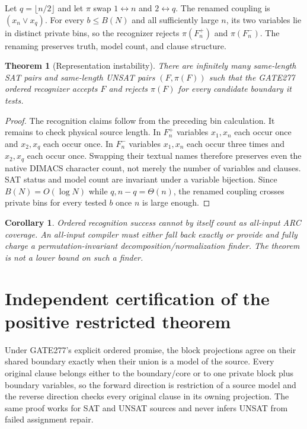 \documentclass[11pt]{article}
\newtheorem{theorem}{Theorem}
\newtheorem{corollary}{Corollary}
\begin{document}
Let $q=\lfloor n/2\rfloor$ and let $\pi$ swap $1\leftrightarrow n$ and
$2\leftrightarrow q$.  The renamed coupling is $(x_n\vee x_q)$.  For every
$b\le B(N)$ and all sufficiently large $n$, its two variables lie in distinct
private bins, so the recognizer rejects $\pi(F_n^+)$ and $\pi(F_n^-)$.  The
renaming preserves truth, model count, and clause structure.

\begin{theorem}[Representation instability]
There are infinitely many same-length SAT pairs and same-length UNSAT pairs
$(F,\pi(F))$ such that the GATE277 ordered recognizer accepts $F$ and rejects
$\pi(F)$ for every candidate boundary it tests.
\end{theorem}
\begin{proof}
The recognition claims follow from the preceding bin calculation.  It remains
to check physical source length.  In $F_n^+$ variables $x_1,x_n$ each occur
once and $x_2,x_q$ each occur once.  In $F_n^-$ variables $x_1,x_n$ each
occur three times and $x_2,x_q$ each occur once.  Swapping their textual names
therefore preserves even the native DIMACS character count, not merely the
number of variables and clauses.  SAT status and model count are invariant
under a variable bijection.  Since $B(N)=O(\log N)$ while $q,n-q=\Theta(n)$,
the renamed coupling crosses private bins for every tested $b$ once $n$ is
large enough.
\end{proof}

\begin{corollary}
Ordered recognition success cannot by itself count as all-input ARC coverage.
An all-input compiler must either fall back exactly or provide and fully charge
a permutation-invariant decomposition/normalization finder.  The theorem is
not a lower bound on such a finder.
\end{corollary}

\section{Independent certification of the positive restricted theorem}
Under GATE277's explicit ordered promise, the block projections agree on their
shared boundary exactly when their union is a model of the source.  Every
original clause belongs either to the boundary/core or to one private block
plus boundary variables, so the forward direction is restriction of a source
model and the reverse direction checks every original clause in its owning
projection.  The same proof works for SAT and UNSAT sources and never infers
UNSAT from failed assignment repair.
\end{document}
